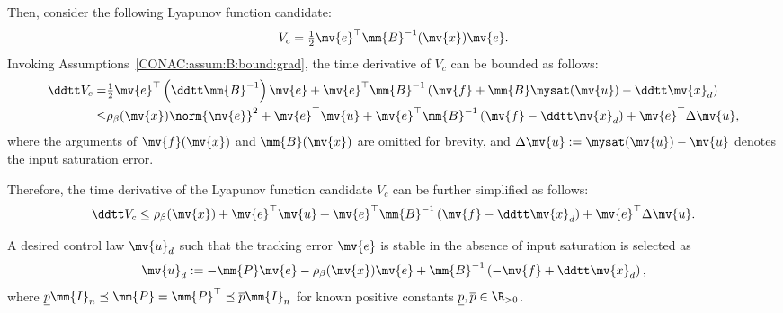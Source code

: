 Then, consider the following Lyapunov function candidate:
\begin{equation}
  \label{CONAC:eq:Vc}
  V_c = \tfrac{1}{2}\mv{e}^\top\mm{B}^{-1}(\mv{x})\mv{e}
  .
\end{equation}
Invoking Assumptions~\ref{CONAC:assum:B:bound:grad}, the time derivative of $V_c$ can be bounded as follows:
\begin{align} \label{CONAC:eq:Vc:dot:1} \nonumber
  \ddtt V_c
  =&
  \tfrac{1}{2}\mv{e}^\top
  \left(
    \ddtt\mm{B}^{-1}
  \right)
  \mv{e}
  +
  \mv{e}^\top\mm{B}^{-1}
  \left(
    \mv{f} + \mm{B}\mysat(\mv{u}) 
    - \ddtt\mv{x}_d
  \right)
  \\
  \le&
  \rho_{\beta}(\mv{x})
  \norm{\mv{e}}^2
  +
  \mv{e}^\top\mv{u}
  +
  \mv{e}^\top\mm{B}^{-1}
  \left(
    \mv{f}- \ddtt\mv{x}_d
  \right)
  +
  \mv{e}^\top
  \Delta\mv{u}
  ,
\end{align}
where the arguments of $\mv{f}(\mv{x})$ and $\mm{B}(\mv{x})$ are omitted for brevity, and $\Delta\mv{u}:=\mysat(\mv{u}) - \mv{u}$ denotes the input saturation error.

Therefore, the time derivative of the Lyapunov function candidate $V_c$ can be further simplified as follows:
\begin{equation} \label{CONAC:eq:Vc:dot:2}
  \ddtt V_c
  \le
  \rho_{\beta}(\mv{x}) + \mv{e}^\top \mv{u}
  +
  \mv{e}^\top\mm{B}^{-1}
  \left(
    \mv{f}- \ddtt\mv{x}_d
  \right)
  +
  \mv{e}^\top
  \Delta\mv{u}
  .
\end{equation}

A desired control law $\mv{u}_d$ such that the tracking error $\mv{e}$ is stable in the absence of input saturation is selected as 
\begin{equation} \label{eq:ctrl:ideal}
  \mv{u}_d
  :=
  -
  \mm{P}
  \mv{e}
  - 
  \rho_{\beta}(\mv{x})
  \mv{e}
  +
  \mm{B}^{-1}
  \left(
    - \mv{f} 
    + \ddtt\mv{x}_d
  \right)
  ,
\end{equation}
where $\underline{p}\mm{I}_n \preceq \mm{P}=\mm{P}^\top \preceq \overline{p}\mm{I}_n$ for known positive constants $\underline{p},\overline{p}\in\R_{>0}$.

